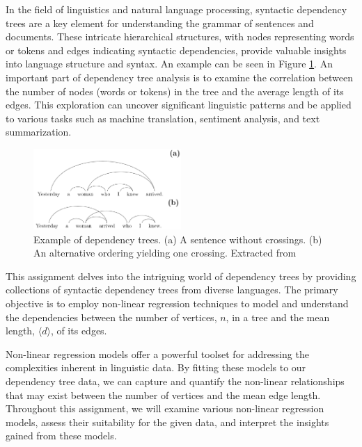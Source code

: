 In the field of linguistics and natural language processing, syntactic dependency trees are a key element for understanding the grammar of sentences and documents. These intricate hierarchical structures, with nodes representing words or tokens and edges indicating syntactic dependencies, provide valuable insights into language structure and syntax. An example can be seen in Figure \ref{fig:example_tree}. An important part of dependency tree analysis is to examine the correlation between the number of nodes (words or tokens) in the tree and the average length of its edges. This exploration can uncover significant linguistic patterns and be applied to various tasks such as machine translation, sentiment analysis, and text summarization.

\begin{figure}[!hbt]
    \centering
    \includegraphics[width=0.5\textwidth]{figures/Screenshot_20231107_105607.png}
    \caption{Example of dependency trees. (a) A sentence without crossings. (b) An alternative ordering yielding one crossing. Extracted from \cite{Ferrer_i_Cancho_2014}}
    \label{fig:example_tree}
\end{figure}

This assignment delves into the intriguing world of dependency trees by providing collections of syntactic dependency trees from diverse languages. The primary objective is to employ non-linear regression techniques to model and understand the dependencies between the number of vertices, $n$, in a tree and the mean length, $\langle d \rangle$, of its edges.

Non-linear regression models offer a powerful toolset for addressing the complexities inherent in linguistic data. By fitting these models to our dependency tree data, we can capture and quantify the non-linear relationships that may exist between the number of vertices and the mean edge length. Throughout this assignment, we will examine various non-linear regression models, assess their suitability for the given data, and interpret the insights gained from these models.